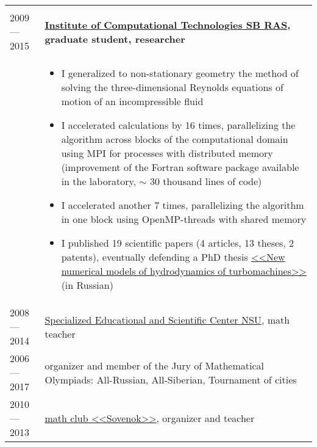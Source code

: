 \documentclass[11pt]{article}
\begin{document}
\begin{longtable} {l | p{}}
\begin{itemize}
\end{itemize}
\\
2009 — 2015 & {\textbf{\href{http://www.ict.nsc.ru}{Institute of Computational Technologies SB RAS}, graduate student, researcher}}\\
& \vspace{-1em}
\begin{itemize}
	\item I generalized to non-stationary geometry the method of solving the three-dimensional Reynolds equations of motion of an incompressible fluid
	\item I accelerated calculations by 16 times, parallelizing the algorithm across blocks of the computational domain using MPI for processes with distributed memory (improvement of the Fortran software package available in the laboratory, $\sim$ 30 thousand lines of code)
	\item I accelerated another 7 times, parallelizing the algorithm in one block using OpenMP-threads with shared memory
	\item I published 19 scientific papers (4 articles, 13 theses, 2 patents), eventually defending a PhD thesis \href{https://github.com/avalur/dissertation/blob/master/to_print/autoref_Avdyushenko.pdf}{<<New numerical models of hydrodynamics of turbomachines>>} (in Russian)
\end{itemize}
\\

2008 — 2014 & {\href{http://sesc.nsu.ru}{Specialized Educational and Scientific Center NSU}, math teacher}\\
2006 — 2017 & {organizer and member of the Jury of Mathematical Olympiads: All-Russian, All-Siberian, Tournament of cities}\\
2010 — 2013 & {\href{https://www.sovenok.academy/}{math club <<Sovenok>>}, organizer and teacher}\\

\end{longtable}
\end{document}
